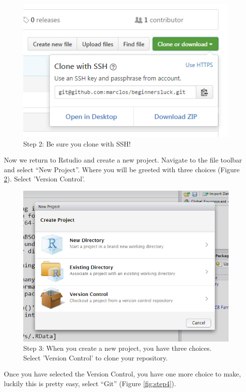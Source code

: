 \documentclass[12pt]{../SOP3_beta}
\begin{document}
\begin{figure}[H]
\includegraphics{graphics/CloningGithub2.jpg}
\caption{Step 2: Be sure you clone with SSH!}
\label{fig:step2}
\end{figure}

\NP Now we return to Rstudio and create a new project. Navigate to the file toolbar and select ``New Project''. Where you will be greeted with three choices (Figure \ref{fig:step3}). Select 'Version Control'. 
\begin{figure}[H]
\includegraphics{graphics/RstudioNewProject.jpg}
\caption{Step 3: When you create a new project, you have three choices. Select 'Version Control' to clone your repository.}
\label{fig:step3}
\end{figure}

\NP Once you have selected the Version Control, you have one more choice to make, luckily this is pretty easy, select ``Git'' (Figure \ref{fig:step4}).
\end{document}
